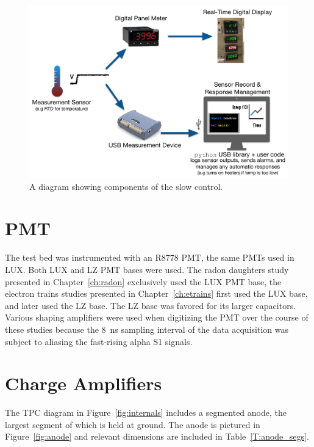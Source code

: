 \begin{figure}[htbp]
\begin{center}
\includegraphics[width=\textwidth]{figures/testbed/slow_control.png}
\caption{A diagram showing components of the slow control.}
\label{fig:sc}
\end{center}
\end{figure}


\section{\ac{PMT}}
The test bed was instrumented with an R8778 \ac{PMT}, the same \ac{PMT}s used in \ac{LUX}. Both \ac{LUX} and LZ \ac{PMT} bases were used. The radon daughters study presented in Chapter~\ref{ch:radon} exclusively used the \ac{LUX} \ac{PMT} base, the electron trains studies presented in Chapter~\ref{ch:etrains} first used the \ac{LUX} base, and later used the LZ base. The LZ base was favored for its larger capacitors. Various shaping amplifiers were used when digitizing the \ac{PMT} over the course of these studies because the 8~ns sampling interval of the data acquisition was subject to aliasing the fast-rising alpha S1 signals.



\section{Charge Amplifiers}
The \ac{TPC} diagram in Figure~\ref{fig:internals} includes a segmented anode, the largest segment of which is held at ground. The anode is pictured in Figure~\ref{fig:anode} and relevant dimensions are included in Table~\ref{T:anode_segs}.

